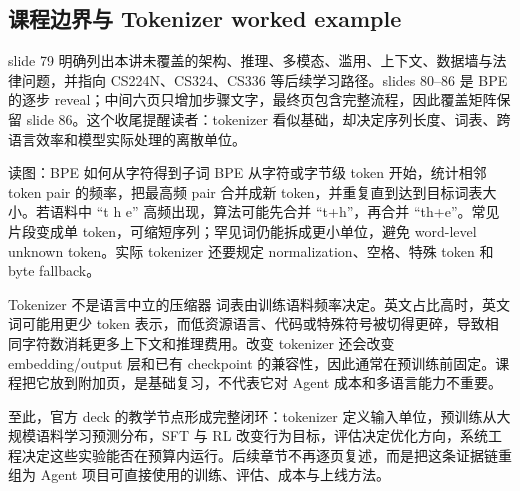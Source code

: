 \subsection{课程边界与 Tokenizer worked example}

slide 79 明确列出本讲未覆盖的架构、推理、多模态、滥用、上下文、数据墙与法律问题，并指向 CS224N、CS324、CS336 等后续学习路径。slides 80--86 是 BPE 的逐步 reveal；中间六页只增加步骤文字，最终页包含完整流程，因此覆盖矩阵保留 slide 86。这个收尾提醒读者：tokenizer 看似基础，却决定序列长度、词表、跨语言效率和模型实际处理的离散单位。


\begin{knowledgebox}{读图：BPE 如何从字符得到子词}
BPE 从字符或字节级 token 开始，统计相邻 token pair 的频率，把最高频 pair 合并成新 token，并重复直到达到目标词表大小。若语料中 ``t h e'' 高频出现，算法可能先合并 ``t+h''，再合并 ``th+e''。常见片段变成单 token，可缩短序列；罕见词仍能拆成更小单位，避免 word-level unknown token。实际 tokenizer 还要规定 normalization、空格、特殊 token 和 byte fallback。
\end{knowledgebox}

\begin{warningbox}{Tokenizer 不是语言中立的压缩器}
词表由训练语料频率决定。英文占比高时，英文词可能用更少 token 表示，而低资源语言、代码或特殊符号被切得更碎，导致相同字符数消耗更多上下文和推理费用。改变 tokenizer 还会改变 embedding/output 层和已有 checkpoint 的兼容性，因此通常在预训练前固定。课程把它放到附加页，是基础复习，不代表它对 Agent 成本和多语言能力不重要。
\end{warningbox}

至此，官方 deck 的教学节点形成完整闭环：tokenizer 定义输入单位，预训练从大规模语料学习预测分布，SFT 与 RL 改变行为目标，评估决定优化方向，系统工程决定这些实验能否在预算内运行。后续章节不再逐页复述，而是把这条证据链重组为 Agent 项目可直接使用的训练、评估、成本与上线方法。

